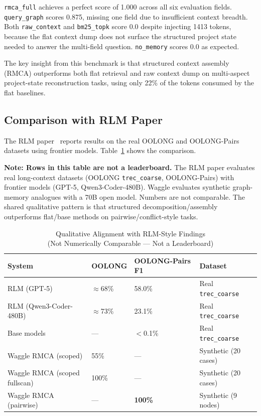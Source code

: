 \documentclass[conference]{IEEEtran}
\begin{document}
\texttt{rmca\_full} achieves a perfect score of 1.000 across all six evaluation fields.
\texttt{query\_graph} scores 0.875, missing one field due to insufficient context breadth.
Both \texttt{raw\_context} and \texttt{bm25\_topk} score 0.0 despite injecting 1413 tokens,
because the flat context dump does not surface the structured project state needed to answer
the multi-field question. \texttt{no\_memory} scores 0.0 as expected.

The key insight from this benchmark is that structured context assembly (RMCA) outperforms
both flat retrieval and raw context dump on multi-aspect project-state reconstruction tasks,
using only 22\% of the tokens consumed by the flat baselines.

\subsection{Comparison with RLM Paper}

The RLM paper~\cite{zhang2026rlm} reports results on the real OOLONG and OOLONG-Pairs
datasets using frontier models. Table~\ref{tab:rlm_compare} shows the comparison.

\textbf{Note: Rows in this table are not a leaderboard.} The RLM paper evaluates real long-context datasets (OOLONG \texttt{trec\_coarse}, OOLONG-Pairs) with frontier models (GPT-5, Qwen3-Coder-480B). Waggle evaluates synthetic graph-memory analogues with a 70B open model. Numbers are not comparable. The shared qualitative pattern is that structured decomposition/assembly outperforms flat/base methods on pairwise/conflict-style tasks.

\begin{table}[htbp]
\caption{Qualitative Alignment with RLM-Style Findings\\
(Not Numerically Comparable --- Not a Leaderboard)}
\label{tab:rlm_compare}
\centering
\begin{tabular}{p{2.8cm}p{1.5cm}p{1.5cm}p{1.2cm}}
\toprule
\textbf{System} & \textbf{OOLONG} & \textbf{OOLONG-Pairs F1} & \textbf{Dataset} \\
\midrule
RLM (GPT-5)~\cite{zhang2026rlm} & $\approx$68\% & 58.0\% & Real \texttt{trec\_coarse} \\
RLM (Qwen3-Coder-480B)~\cite{zhang2026rlm} & $\approx$73\% & 23.1\% & Real \texttt{trec\_coarse} \\
Base models~\cite{zhang2026rlm} & --- & $<$0.1\% & Real \texttt{trec\_coarse} \\
\midrule
Waggle RMCA (scoped) & 55\% & --- & Synthetic (20 cases) \\
Waggle RMCA (scoped fullscan) & 100\% & --- & Synthetic (20 cases) \\
Waggle RMCA (pairwise) & --- & \textbf{100\%} & Synthetic (9 nodes) \\
\bottomrule
\end{tabular}
\end{table}
\end{document}
